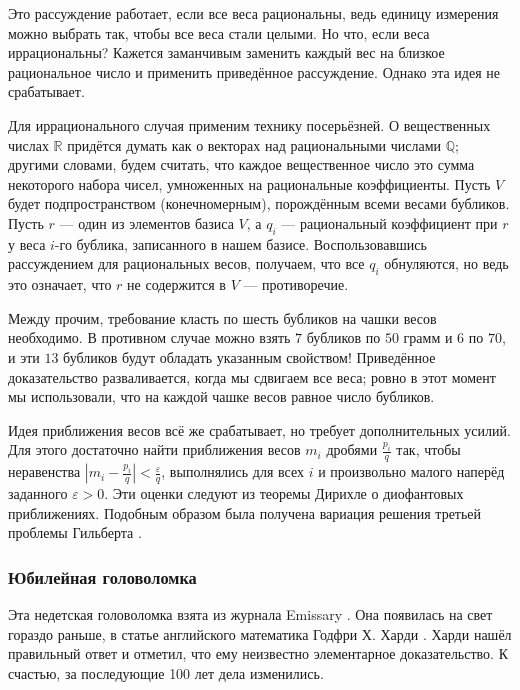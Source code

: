 Это рассуждение работает, если все веса рациональны, ведь единицу измерения можно выбрать так, чтобы все веса стали целыми.
Но что, если веса иррациональны?
Кажется заманчивым заменить каждый вес на близкое рациональное число и применить приведённое рассуждение.
Однако эта идея не срабатывает.

Для иррационального случая применим технику посерьёзней.
О вещественных числах $\mathbb{R}$ придётся думать как о векторах над рациональными числами $\mathbb{Q}$;
другими словами, будем считать, что каждое вещественное число это сумма некоторого набора чисел, умноженных на рациональные коэффициенты.
Пусть $V$ будет подпространством (конечномерным), порождённым всеми весами бубликов.
Пусть $r$ --- один из элементов базиса $V$, а $q_i$ --- рациональный коэффициент при $r$ у веса $i$-го бублика, записанного в нашем базисе.
Воспользовавшись рассуждением для рациональных весов, получаем, что все $q_i$ обнуляются, но ведь это означает, что $r$ не содержится в $V$ --- противоречие.

Между прочим, требование класть по шесть бубликов на чашки весов необходимо.
В противном случае можно взять $7$ бубликов по $50$ грамм и $6$ по $70$, и эти $13$ бубликов будут обладать указанным свойством!
Приведённое доказательство разваливается, когда мы сдвигаем все веса;
ровно в этот момент мы использовали, что на каждой чашке весов равное число бубликов.

\begin{addedbytheeditors}
Идея приближения весов всё же срабатывает, но требует дополнительных усилий.
Для этого достаточно найти приближения весов $m_i$ дробями $\tfrac{p_i}q$ так, чтобы неравенства
$|m_i-\tfrac{p_i}q|<\tfrac\varepsilon q$,
выполнялись для всех $i$ и произвольно малого наперёд заданного $\varepsilon>0$.
Эти оценки следуют из теоремы Дирихле о диофантовых приближениях.
Подобным образом была получена вариация решения третьей проблемы Гильберта \cite{benko}. 
\pr
\end{addedbytheeditors}


\subsubsection*{Юбилейная головоломка}

Эта недетская головоломка взята из журнала Emissary \cite[Осень 2004]{3}.
Она появилась на свет гораздо раньше, в статье %
английского математика Годфри Х. Харди \cite{37}. 
Харди нашёл правильный ответ и отметил, что ему неизвестно элементарное доказательство.
К счастью, за последующие 100 лет дела изменились.

